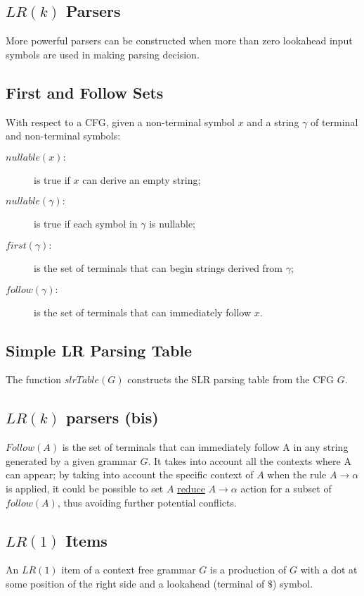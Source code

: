 \subsection{$LR(k)$ Parsers}
More powerful parsers can be constructed when more than zero lookahead input symbols are used in making parsing decision.

\subsection{First and Follow Sets}
With respect to a CFG, given a non-terminal symbol $x$ and a string $\gamma$ of terminal and non-terminal symbols:
\begin{description}
	\item[$nullable(x):$] is true if $x$ can derive an empty string;
	\item[$nullable(\gamma):$] is true if each symbol in $\gamma$ is nullable;
	\item[$first(\gamma):$] is the set of terminals that can begin strings derived from $\gamma$;
	\item[$follow(\gamma):$] is the set of terminals that can immediately follow $x$.
\end{description}

\subsection{Simple LR Parsing Table}
The function $slrTable(G)$ constructs the SLR parsing table from the CFG $G$.

\subsection{$LR(k)$ parsers (bis)}
$Follow(A)$ is the set of terminals that can immediately follow A in any string generated by a given grammar $G$.
It takes into account all the contexts where A can appear; by taking into account the specific context of $A$ when the rule $A \to \alpha$ is applied, it could be possible to set $A$ \underline{reduce} $A \to \alpha$ action for a subset of $follow(A)$, thus avoiding further potential conflicts.

\subsection{$LR(1)$ Items}
An $LR(1)$ item of a context free grammar $G$ is a production of $G$ with a dot at some position of the right side and a lookahead (terminal of $\$$) symbol.

